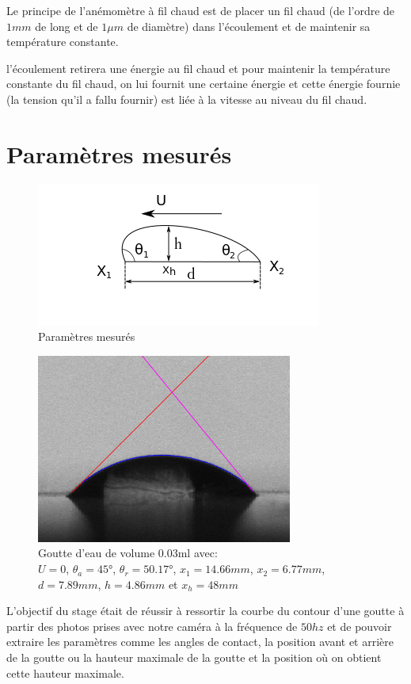 \documentclass[french]{article}
\begin{document}
Le principe de l'anémomètre à fil chaud est de placer un fil chaud (de l'ordre de $1mm$ de long et de $1\mu m$ de diamètre) dans l'écoulement et de maintenir sa température constante.

l'écoulement retirera une énergie au fil chaud et pour maintenir la température constante du fil chaud, on lui fournit une certaine énergie et cette énergie fournie (la tension qu'il a fallu fournir) est liée à la vitesse au niveau du fil chaud.


\section{Paramètres mesurés}

\begin{figure}[!ht]
	\centering
	\includegraphics[scale = 1]{./image/rrgou2.png}
	\caption{Paramètres mesurés}
\end{figure}
\begin{figure}[!ht]
	\centering
	\includegraphics[scale = 0.5]{./image/crop_tvitesse=28_volume=003.png}
	\caption{Goutte d'eau de volume $0.03$ml avec: \\$U = 0$, $\theta_{a} = \ang{45}$, $\theta_{r} = \ang{50.17}$, $x_{1} = 14.66mm$, $x_{2} = 6.77mm$,\\ $d = 7.89mm$, $h = 4.86mm$ et $x_{h} = 48mm$}
\end{figure}


L'objectif du stage était de réussir à ressortir la courbe du contour d'une goutte à partir des photos prises avec notre caméra à la fréquence de $50hz$ et de pouvoir extraire les paramètres comme les angles de contact, la position avant et arrière de la goutte ou la hauteur maximale de la goutte et la position où on obtient cette hauteur maximale.
\end{document}
